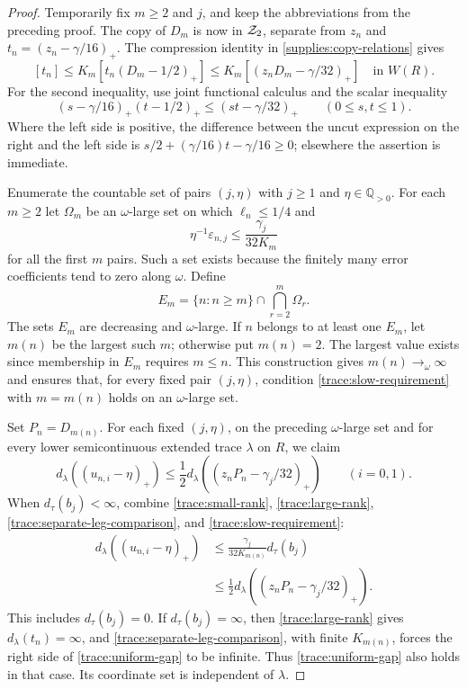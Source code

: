 \begin{proof}
Temporarily fix $m\geq2$ and $j$, and keep the abbreviations from
the preceding proof.  The copy of $D_m$ is now in $\mathcal Z_2$, separate
from $z_n$ and $t_n=(z_n-\gamma/16)_+$.  The compression identity
in \eqref{supplies:copy-relations} gives
\begin{equation}\label{trace:separate-leg-comparison}
 [t_n]\leq K_m[t_n(D_m-1/2)_+]
       \leq K_m[(z_nD_m-\gamma/32)_+]
 \quad\text{in }W(R).
\end{equation}
For the second inequality, use joint functional calculus and the
scalar inequality
\[
 (s-\gamma/16)_+(t-1/2)_+
      \leq(st-\gamma/32)_+\qquad(0\leq s,t\leq1).
\]
Where the left side is positive, the difference between the
uncut expression on the right and the left side is
$s/2+(\gamma/16)t-\gamma/16\geq0$; elsewhere the assertion is
immediate.

Enumerate the countable set of pairs $(j,\eta)$ with
$j\geq1$ and $\eta\in\mathbb Q_{>0}$.  For each $m\geq2$ let
$\Omega_m$ be an $\omega$-large set on which $\ell_n\leq1/4$ and
\begin{equation}\label{trace:slow-requirement}
 \eta^{-1}\varepsilon_{n,j}
       \leq\frac{\gamma_j}{32K_m}
\end{equation}
for all the first $m$ pairs.  Such a set exists because the finitely
many error coefficients tend to zero along $\omega$.  Define
\[
 E_m=\{n:n\geq m\}\cap\bigcap_{r=2}^m\Omega_r.
\]
The sets $E_m$ are decreasing and $\omega$-large.  If $n$ belongs
to at least one $E_m$, let $m(n)$ be the largest such $m$; otherwise
put $m(n)=2$.  The largest value exists since membership in $E_m$
requires $m\leq n$.  This construction gives
$m(n)\to_\omega\infty$ and ensures that, for every fixed pair
$(j,\eta)$, condition \eqref{trace:slow-requirement} with
$m=m(n)$ holds on an $\omega$-large set.

Set $P_n=D_{m(n)}$.  For each fixed $(j,\eta)$, on the preceding
$\omega$-large set and for every lower semicontinuous extended
trace $\lambda$ on $R$, we claim
\begin{equation}\label{trace:uniform-gap}
 d_\lambda((u_{n,i}-\eta)_+)
 \leq\frac12 d_\lambda((z_nP_n-\gamma_j/32)_+)
 \qquad(i=0,1).
\end{equation}
When $d_\tau(b_j)<\infty$, combine
\eqref{trace:small-rank}, \eqref{trace:large-rank},
\eqref{trace:separate-leg-comparison}, and
\eqref{trace:slow-requirement}:
\[
 \begin{split}
 d_\lambda((u_{n,i}-\eta)_+)
 &\leq \frac{\gamma_j}{32K_{m(n)}}d_\tau(b_j)\\
 &\leq\frac12
      d_\lambda((z_nP_n-\gamma_j/32)_+).
 \end{split}
\]
This includes $d_\tau(b_j)=0$.  If $d_\tau(b_j)=\infty$, then
\eqref{trace:large-rank} gives $d_\lambda(t_n)=\infty$, and
\eqref{trace:separate-leg-comparison}, with finite $K_{m(n)}$,
forces the right side of \eqref{trace:uniform-gap} to be infinite.
Thus \eqref{trace:uniform-gap} also holds in that case.  Its
coordinate set is independent of $\lambda$.


\end{proof}
